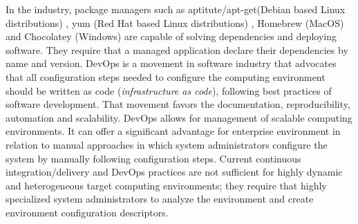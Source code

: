 In the industry, package managers such as aptitute/apt-get(Debian based Linux distributions) \cite{aoki_debian_2016}, yum (Red Hat based Linux distributions) \cite{svistunov_red_2016}, Homebrew (MacOS)\cite{homebrew_homebrew_2016} and Chocolatey (Windows)\cite{chocolatey_chocolatey_2016} are capable of solving dependencies and deploying software. They require that a managed application declare their dependencies by name and version. DevOps\cite{bang_grounded_2013} is a movement in software industry that advocates that all configuration steps needed to configure the computing environment should be written as code (\emph{infrastructure as code}), following best practices of software development. That movement favors the documentation, reproducibility, automation and scalability.
DevOps allows for management of scalable computing environments. It can offer a significant advantage for enterprise environment in relation to manual approaches in which system administrators configure the system by manually following configuration steps. Current continuous integration/delivery and DevOps practices are not sufficient for highly dynamic and heterogeneous target computing environments; they require that highly specialized system administrators to analyze the environment and create environment configuration descriptors.
